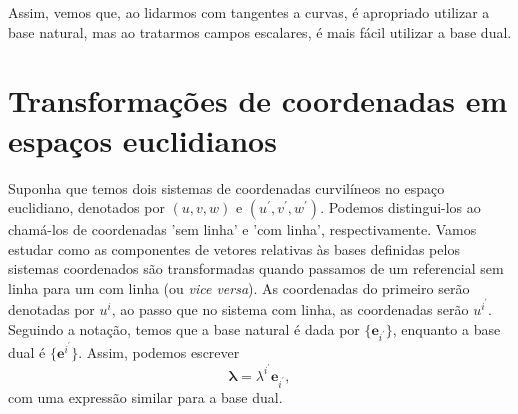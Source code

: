 Assim, vemos que, ao lidarmos com tangentes a curvas, é apropriado utilizar a base natural, mas ao tratarmos campos escalares, é mais fácil utilizar a base dual.


\section{Transformações de coordenadas em espaços euclidianos}\label{sec:TransformacoesCoordenadas}

Suponha que temos dois sistemas de coordenadas curvilíneos no espaço euclidiano, denotados por $(u,v,w)$ e $(u^\prime,v^\prime,w^\prime)$. Podemos distingui-los ao chamá-los de coordenadas 'sem linha' e 'com linha', respectivamente. Vamos estudar como as componentes de vetores relativas às bases definidas pelos sistemas coordenados são transformadas quando passamos de um referencial sem linha para um com linha (ou \textit{vice versa}). As coordenadas do primeiro serão denotadas por $u^i$, ao passo que no sistema com linha, as coordenadas serão $u^{i^\prime}$. Seguindo a notação, temos que a base natural é dada por $\{\mathbf{e}_{i^\prime}\}$, enquanto a base dual é $\{\mathbf{e}^{i^\prime}\}$. Assim, podemos escrever
\begin{equation}\label{eq:CoordenadasLinha}
	\boldsymbol{\lambda}=\lambda^{i^\prime}\mathbf{e}_{i^\prime} , 
\end{equation}
com uma expressão similar para a base dual.

